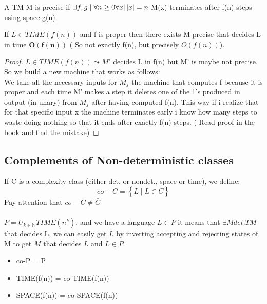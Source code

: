 \begin{definition}
    A TM M is precise if $\exists f,g \mid \forall n\geq 0 \forall x | \left\lvert x\right\rvert = n $ M(x) terminates after f(n) steps using space g(n). 
\end{definition}
\begin{property}
    If $L \in TIME(f(n))$ and f is proper then there exists M precise that decides L in time $\mathbf{O(f(n))}$ ( So not exactly f(n), but precisely $O(f(n))$).
    \begin{proof}
        $L \in TIME(f(n)) \leadsto M'$ decides L in f(n) but M' is maybe not precise. So we build a new machine that works as follows:\\
        We take all the necessary inputs for $M_f$ the machine that computes f because it is proper and each time M' makes a step it deletes one of the 1's produced in output (in unary) from $M_f$ after having computed f(n). This way if i realize that for that specific input x the machine terminates early i know how many steps to waste doing nothing so that it ends after exactly f(n) steps. ( Read proof in the book and find the mistake)
    \end{proof}
\end{property}
\subsection{Complements of Non-deterministic classes}
If C is a complexity class (either det. or nondet., space or time), we define:
\[ 
    co-C = \left\{ \bar{L} \mid L \in C \right\} 
\]Pay attention that $co-C \neq \bar{C}$\\\\
$P = U_{k\in\mathbb{N}}TIME(n^k)$, and we have a language $L \in P$ it means that $\exists M det. TM$ that decides L, we can easily get $\bar{L}$ by inverting accepting and rejecting states of M to get $\bar{M}$ that decides $\bar{L}$ and $\bar{L} \in P$
\begin{itemize}
    \item co-P = P
    \item TIME(f(n)) = co-TIME(f(n))
    \item SPACE(f(n)) = co-SPACE(f(n))
\end{itemize}
